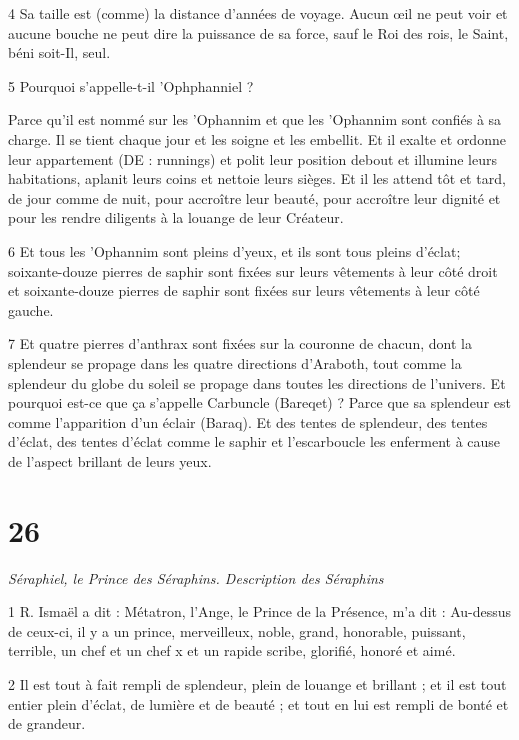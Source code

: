 \par 4 Sa taille est (comme) la distance d'années de voyage. Aucun œil ne peut voir et aucune bouche ne peut dire la puissance de sa force, sauf le Roi des rois, le Saint, béni soit-Il, seul.

\par 5 Pourquoi s'appelle-t-il 'Ophphanniel ?

\par Parce qu'il est nommé sur les 'Ophannim et que les 'Ophannim sont confiés à sa charge. Il se tient chaque jour et les soigne et les embellit. Et il exalte et ordonne leur appartement (DE : runnings) et polit leur position debout et illumine leurs habitations, aplanit leurs coins et nettoie leurs sièges. Et il les attend tôt et tard, de jour comme de nuit, pour accroître leur beauté, pour accroître leur dignité et pour les rendre diligents à la louange de leur Créateur.

\par 6 Et tous les 'Ophannim sont pleins d'yeux, et ils sont tous pleins d'éclat; soixante-douze pierres de saphir sont fixées sur leurs vêtements à leur côté droit et soixante-douze pierres de saphir sont fixées sur leurs vêtements à leur côté gauche.

\par 7 Et quatre pierres d'anthrax sont fixées sur la couronne de chacun, dont la splendeur se propage dans les quatre directions d'Araboth, tout comme la splendeur du globe du soleil se propage dans toutes les directions de l'univers. Et pourquoi est-ce que ça s'appelle Carbuncle (Bareqet) ? Parce que sa splendeur est comme l’apparition d’un éclair (Baraq). Et des tentes de splendeur, des tentes d'éclat, des tentes d'éclat comme le saphir et l'escarboucle les enferment à cause de l'aspect brillant de leurs yeux.

\chapter{26}

\par \textit{Séraphiel, le Prince des Séraphins. Description des Séraphins}

\par 1 R. Ismaël a dit : Métatron, l'Ange, le Prince de la Présence, m'a dit : Au-dessus de ceux-ci, il y a un prince, merveilleux, noble, grand, honorable, puissant, terrible, un chef et un chef x et un rapide scribe, glorifié, honoré et aimé.

\par 2 Il est tout à fait rempli de splendeur, plein de louange et brillant ; et il est tout entier plein d'éclat, de lumière et de beauté ; et tout en lui est rempli de bonté et de grandeur.

